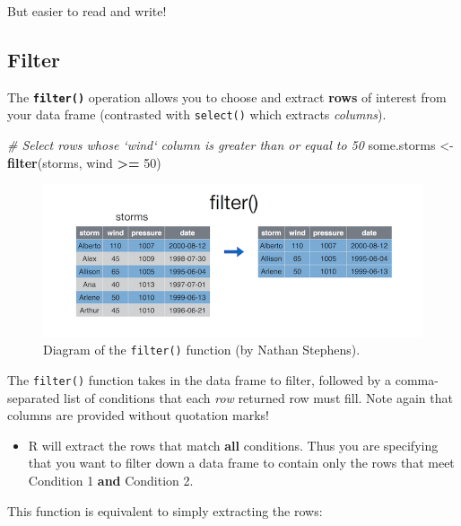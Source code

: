 \documentclass[]{book}
\newenvironment{Shaded}{\begin{snugshade}}{\end{snugshade}}
\newcommand{\KeywordTok}[1]{\textcolor[rgb]{0.13,0.29,0.53}{\textbf{#1}}}
\newcommand{\DecValTok}[1]{\textcolor[rgb]{0.00,0.00,0.81}{#1}}
\newcommand{\StringTok}[1]{\textcolor[rgb]{0.31,0.60,0.02}{#1}}
\newcommand{\CommentTok}[1]{\textcolor[rgb]{0.56,0.35,0.01}{\textit{#1}}}
\newcommand{\OperatorTok}[1]{\textcolor[rgb]{0.81,0.36,0.00}{\textbf{#1}}}
\newcommand{\NormalTok}[1]{#1}
\providecommand{\tightlist}{%
  \setlength{\itemsep}{0pt}\setlength{\parskip}{0pt}}
\theoremstyle{definition}
\theoremstyle{definition}
\theoremstyle{remark}
\begin{document}
But easier to read and write!

\subsection{Filter}\label{filter}

The \textbf{\texttt{filter()}} operation allows you to choose and
extract \textbf{rows} of interest from your data frame (contrasted with
\texttt{select()} which extracts \emph{columns}).

\begin{Shaded}
\begin{Highlighting}[]
\CommentTok{# Select rows whose `wind` column is greater than or equal to 50}
\NormalTok{some.storms <-}\StringTok{ }\KeywordTok{filter}\NormalTok{(storms, wind }\OperatorTok{>=}\StringTok{ }\DecValTok{50}\NormalTok{)}
\end{Highlighting}
\end{Shaded}

\begin{figure}
\centering
\includegraphics{img/dplyr/filter.png}
\caption{Diagram of the \texttt{filter()} function (by Nathan
Stephens).}
\end{figure}

The \texttt{filter()} function takes in the data frame to filter,
followed by a comma-separated list of conditions that each \emph{row}
returned row must fill. Note again that columns are provided without
quotation marks!

\begin{itemize}
\tightlist
\item
  R will extract the rows that match \textbf{all} conditions. Thus you
  are specifying that you want to filter down a data frame to contain
  only the rows that meet Condition 1 \textbf{and} Condition 2.
\end{itemize}

This function is equivalent to simply extracting the rows:
\end{document}
